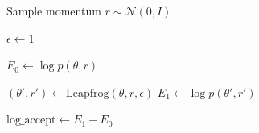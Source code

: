 \documentclass[a4paper,12pt]{article}
\begin{document}
	\begin{algorithm}[H]
		\caption{Heuristic for choosing an initial value of $\epsilon$}
		
		Sample momentum $r \sim \mathcal{N}(0, I)$\;
		
		$\epsilon \leftarrow 1$\;
		
		$E_0 \leftarrow \log p(\theta, r)$\;
		
		$(\theta', r') \leftarrow \text{Leapfrog}(\theta, r, \epsilon)$\;
		$E_1 \leftarrow \log p(\theta', r')$\;
		
		$\text{log\_accept} \leftarrow E_1 - E_0$\;
		
		
		
		\Return{$\epsilon$}\;
		
	\end{algorithm}

\vspace{.5cm}
\end{document}
